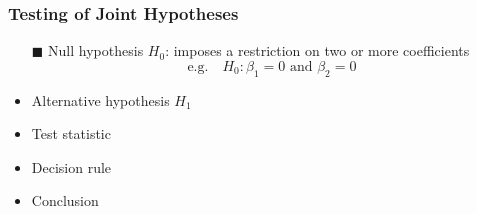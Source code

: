 \documentclass[11pt, xcolor=x11names,compress]{beamer}
\begin{document}
\begin{frame}[fragile,t]
\linespread{1.15}
\frametitle{Testing of Joint Hypotheses}
\begin{itemize}
    \item [$\blacksquare$] Null hypothesis $H_0$: imposes a restriction on two or more coefficients\\
    $$
    \text{e.g.} \quad H_0: \beta_1 = 0 \text{ and } \beta_2 = 0
    $$
    \item Alternative hypothesis $H_1$
    \item Test statistic
    \item Decision rule
    \item Conclusion
\end{itemize}

\end{frame}
\end{document}
